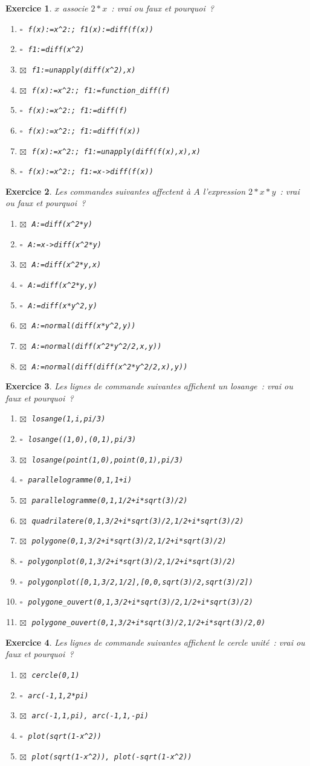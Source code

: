 \documentclass{article}
\newcommand{\faux}{$\square\;$}
\newcommand{\vrai}{$\boxtimes\;$}
\newcommand{\itemf}{\item\faux}
\newcommand{\itemvv}{\item\vrai}
\newtheorem{exo}{Exercice}[section]
\begin{document}
\begin{giacjshere}
\begin{exo}
{$x$ associe $2*x$~: 
vrai ou faux et pourquoi~?
\begin{enumerate}
\itemf
\verb|f(x):=x^2:; f1(x):=diff(f(x))|
\itemf
\verb|f1:=diff(x^2)|
\itemvv
\verb|f1:=unapply(diff(x^2),x)|
\itemvv
\verb|f(x):=x^2:; f1:=function_diff(f)|
\itemf
\verb|f(x):=x^2:; f1:=diff(f)|
\itemf
\verb|f(x):=x^2:; f1:=diff(f(x))|
\itemvv
\verb|f(x):=x^2:; f1:=unapply(diff(f(x),x),x)|
\itemf
\verb|f(x):=x^2:; f1:=x->diff(f(x))|
\end{enumerate}
}\end{exo}
\begin{exo}{\rm
Les commandes suivantes affectent \`a $A$ l'expression $2*x*y$~: 
vrai ou faux et pourquoi~?
\begin{enumerate}
\itemvv
\verb|A:=diff(x^2*y)|
\itemf
\verb|A:=x->diff(x^2*y)|
\itemvv
\verb|A:=diff(x^2*y,x)|
\itemf
\verb|A:=diff(x^2*y,y)|
\itemf
\verb|A:=diff(x*y^2,y)|
\itemvv
\verb|A:=normal(diff(x*y^2,y))|
\itemvv
\verb|A:=normal(diff(x^2*y^2/2,x,y))|
\itemvv
\verb|A:=normal(diff(diff(x^2*y^2/2,x),y))|
\end{enumerate}
}\end{exo}
\begin{exo}{\rm
Les lignes de commande suivantes affichent
un losange~:
vrai ou faux et pourquoi~?
\begin{enumerate}
\itemvv
\verb|losange(1,i,pi/3)|
\itemf
\verb|losange((1,0),(0,1),pi/3)|
\itemvv
\verb|losange(point(1,0),point(0,1),pi/3)|
\itemf
\verb|parallelogramme(0,1,1+i)|
\itemvv
\verb|parallelogramme(0,1,1/2+i*sqrt(3)/2)|
\itemvv
\verb|quadrilatere(0,1,3/2+i*sqrt(3)/2,1/2+i*sqrt(3)/2)|
\itemvv
\verb|polygone(0,1,3/2+i*sqrt(3)/2,1/2+i*sqrt(3)/2)|
\itemf
\verb|polygonplot(0,1,3/2+i*sqrt(3)/2,1/2+i*sqrt(3)/2)|
\itemf
\verb|polygonplot([0,1,3/2,1/2],[0,0,sqrt(3)/2,sqrt(3)/2])|
\itemf
\verb|polygone_ouvert(0,1,3/2+i*sqrt(3)/2,1/2+i*sqrt(3)/2)|
\itemvv
\verb|polygone_ouvert(0,1,3/2+i*sqrt(3)/2,1/2+i*sqrt(3)/2,0)|
\end{enumerate}
}\end{exo}
\begin{exo}{\rm
Les lignes de commande suivantes affichent
le cercle unit\'e~:
vrai ou faux et pourquoi~?
\begin{enumerate}
\itemvv
\verb|cercle(0,1)|
\itemf
\verb|arc(-1,1,2*pi)|
\itemvv
\verb|arc(-1,1,pi), arc(-1,1,-pi)|
\itemf
\verb|plot(sqrt(1-x^2))|
\itemvv
\verb|plot(sqrt(1-x^2)), plot(-sqrt(1-x^2))|

\end{enumerate}}
\end{exo}
\end{giacjshere}
\end{document}
